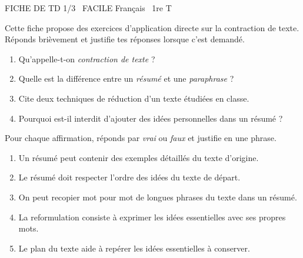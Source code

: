 \documentclass[11pt]{article}
\begin{document}
\begin{tcolorbox}[enhanced,colback=popink,colframe=popink,arc=10pt,boxrule=0pt,left=12pt,right=12pt,top=9pt,bottom=9pt]
{\color{white}\popxbold\small FICHE DE TD 1/3 \textbullet\ FACILE \hfill Français \textbullet\ 1re T\par}
\end{tcolorbox}
\vspace{4pt}
Cette fiche propose des exercices d'application directe sur la contraction de texte. Réponds brièvement et justifie tes réponses lorsque c'est demandé.

\begin{exercice}
\begin{enumerate}
  \item Qu'appelle-t-on \emph{contraction de texte} ?
  \item Quelle est la différence entre un \emph{résumé} et une \emph{paraphrase} ?
  \item Cite deux techniques de réduction d'un texte étudiées en classe.
  \item Pourquoi est-il interdit d'ajouter des idées personnelles dans un résumé ?
\end{enumerate}
\end{exercice}

\begin{exercice}
Pour chaque affirmation, réponds par \emph{vrai} ou \emph{faux} et justifie en une phrase.
\begin{enumerate}
  \item Un résumé peut contenir des exemples détaillés du texte d'origine.
  \item Le résumé doit respecter l'ordre des idées du texte de départ.
  \item On peut recopier mot pour mot de longues phrases du texte dans un résumé.
  \item La reformulation consiste à exprimer les idées essentielles avec ses propres mots.
  \item Le plan du texte aide à repérer les idées essentielles à conserver.
\end{enumerate}
\end{exercice}
\end{document}
